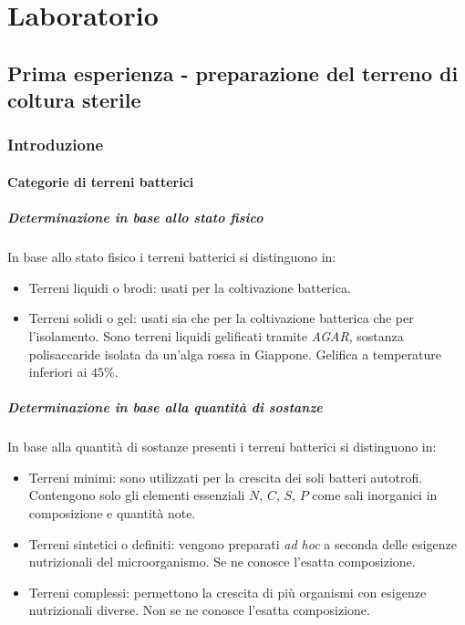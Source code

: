\chapter{Laboratorio}

\section{Prima esperienza - preparazione del terreno di coltura sterile}

	\subsection{Introduzione}

		\subsubsection{Categorie di terreni batterici}

			\paragraph{Determinazione in base allo stato fisico}
			In base allo stato fisico i terreni batterici si distinguono in:
			\begin{itemize}
				\item Terreni liquidi o brodi: usati per la coltivazione batterica.
				\item Terreni solidi o gel: usati sia che per la coltivazione batterica che per l'isolamento.
					Sono terreni liquidi gelificati tramite \emph{AGAR}, sostanza polisaccaride isolata da un'alga rossa in Giappone.
					Gelifica a temperature inferiori ai $45\%$.
			\end{itemize}
	
			\paragraph{Determinazione in base alla quantit\`a di sostanze}
			In base alla quantit\`a di sostanze presenti i terreni batterici si distinguono in:
			\begin{itemize}
				\item Terreni minimi: sono utilizzati per la crescita dei soli batteri autotrofi.
					Contengono solo gli elementi essenziali $N$, $C$, $S$, $P$ come sali inorganici in composizione e quantit\`a note.
				\item Terreni sintetici o definiti: vengono preparati \emph{ad hoc} a seconda delle esigenze nutrizionali del microorganismo.
					Se ne conosce l'esatta composizione.
				\item Terreni complessi: permettono la crescita di pi\`u organismi con esigenze nutrizionali diverse.
					Non se ne conosce l'esatta composizione.
			\end{itemize}

